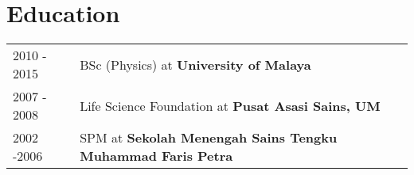 \documentclass[a4paper,12pt]{article}
\begin{document}
  


\section{Education}
\begin{tabularx}{\linewidth}{@{}l X@{}}	
2010 - 2015 & BSc (Physics) at \textbf{University of Malaya} \hfill \\

2007 - 2008 & Life Science Foundation at \textbf{Pusat Asasi Sains, UM} \hfill \\ 

2002 -2006 & SPM at \textbf{Sekolah Menengah Sains Tengku Muhammad Faris Petra} \hfill \\

\end{tabularx}


\end{document}

